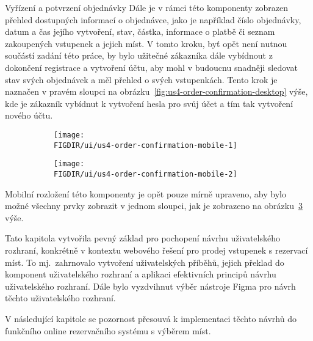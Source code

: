 \begin{subsection}{Vyřízení a potvrzení objednávky}
    Dále je v rámci této komponenty zobrazen přehled dostupných informací o objednávce, jako je například číslo objednávky, datum a čas jejího vytvoření, stav, částka, informace o platbě či seznam zakoupených vstupenek a jejich míst.
    V tomto kroku, byť opět není nutnou součástí zadání této práce, by bylo užitečné zákazníka dále vybídnout z dokončení registrace a vytvoření účtu, aby mohl v budoucnu snadněji sledovat stav svých objednávek a měl přehled o svých vstupenkách.
    Tento krok je naznačen v pravém sloupci na obrázku~\ref{fig:us4-order-confirmation-desktop} výše, kde je zákazník vybídnut k vytvoření hesla pro svůj účet a tím tak vytvoření nového účtu.

    \begin{figure}[H]
        \centering
        \caption{Návrh komponent potvrzení objednávky (mobilní verze)}
        \begin{subfigure}{0.4\textwidth}
            \texttt{[image: \\FIGDIR/ui/us4-order-confirmation-mobile-1]}
            \label{fig:us4-order-confirmation-mobile-1}
        \end{subfigure}
        \hfill
        \begin{subfigure}{0.4\textwidth}
            \texttt{[image: \\FIGDIR/ui/us4-order-confirmation-mobile-2]}
            \label{fig:us4-order-confirmation-mobile-2}
        \end{subfigure}
        \source{}
        \label{fig:us4-order-confirmation-mobile}
    \end{figure}

    Mobilní rozložení této komponenty je opět pouze mírně upraveno, aby bylo možné všechny prvky zobrazit v jednom sloupci, jak je zobrazeno na obrázku~\ref{fig:us4-order-confirmation-mobile} výše.

    Tato kapitola vytvořila pevný základ pro pochopení návrhu uživatelského rozhraní, konkrétně v kontextu webového řešení pro prodej vstupenek s rezervací míst.
    To mj.\ zahrnovalo vytvoření uživatelských příběhů, jejich překlad do komponent uživatelského rozhraní a aplikaci efektivních principů návrhu uživatelského rozhraní.
    Dále bylo vyzdvihnut výběr nástroje Figma pro návrh těchto uživatelského rozhraní.

    V následující kapitole se pozornost přesouvá k implementaci těchto návrhů do funkčního online rezervačního systému s výběrem míst.
\end{subsection}
